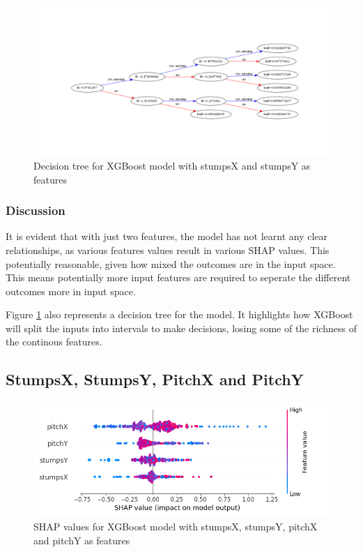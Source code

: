 \documentclass[12pt,a4paper]{report}
\theoremstyle{definition}
\begin{document}
\begin{figure}[H]
    \centering
    \includegraphics[width=\linewidth]{tree_stumps.png}
    \caption{Decision tree for XGBoost model with stumpsX and stumpsY as features}
    \label{fig:TreeStumps}
\end{figure}

\subsubsection{Discussion}

It is evident that with just two features, the model has not learnt any clear relationships, as various features values result in various SHAP values.
This potentially reasonable, given how mixed the outcomes are in the input space.
This means potentially more input features are required to seperate the different outcomes more in input space.

Figure \ref{fig:TreeStumps} also represents a decision tree for the model.
It highlights how XGBoost will split the inputs into intervals to make decisions, losing some of the richness of the continous features.

\subsection{StumpsX, StumpsY, PitchX and PitchY}

\begin{figure}[H]
    \centering
    \includegraphics[width=\linewidth]{shap_stumps_pitch.png}
    \caption{SHAP values for XGBoost model with stumpsX, stumpsY, pitchX and pitchY as features}
    \label{fig:ShapStumpsPitch}
\end{figure}
\end{document}

